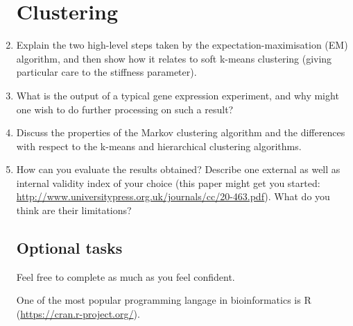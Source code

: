 \documentclass[11pt,runningheads,a4paper]{article}
\begin{document}
\begin{enumerate}
\section*{Clustering}
\label{sec:clustering}

\item  Explain the two high-level steps taken by the expectation-maximisation (EM) algorithm, and then show how it relates to soft k-means clustering (giving particular care to the stiffness parameter).
  \item  What is the output of a typical gene expression experiment, and why might one wish to do further processing on such a result?
  \item Discuss the properties of the Markov clustering algorithm and the differences with respect to the k-means and hierarchical clustering algorithms.
  \item How can you evaluate the results obtained? 
Describe one external as well as internal validity index of your choice (this paper might get you started: \url{http://www.universitypress.org.uk/journals/cc/20-463.pdf}). 
What do you think are their limitations?

\subsection*{Optional tasks}
Feel free to complete as much as you feel confident.

One of the most popular programming langage in bioinformatics is R (\url{https://cran.r-project.org/}).


\end{enumerate}
\end{document}
